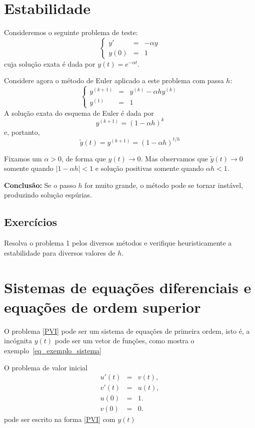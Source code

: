 \section{Estabilidade}

Consideremos o seguinte problema de teste:
$$\left\{\begin{array}{rcl}y'&=&-\alpha y\\y(0)&=&1\end{array}\right.$$
cuja solução exata é dada por $y(t)=e^{-\alpha t}$.

Considere agora o método de Euler aplicado a este problema com passa $h$:
$$\left\{\begin{array}{rcl}y^{(k+1)}&=&y^{(k)}-\alpha h y^{(k)}\\y^{(1)}&=&1\end{array}\right.$$
A solução exata do esquema de Euler é dada por
$$y^{(k+1)}=(1-\alpha h)^{k}$$
e, portanto,
$$\tilde{y}(t)=y^{(k+1)}=(1-\alpha h)^{t/h}$$

Fixamos um $\alpha>0$, de forma que $y(t)\to 0$. Mas observamos que $\tilde{y}(t)\to 0$ somente quando $|1-\alpha h|<1$ e solução positivas somente quando $\alpha h<1$.

{\bf Conclusão:} Se o passo $h$ for muito grande, o método pode se tornar instável, produzindo solução espúrias.




\subsection*{Exercícios}

\begin{exer} Resolva o problema 1 pelos diversos métodos e verifique heuristicamente a estabilidade para diversos valores de $h$.
\end{exer}

\section{Sistemas de equações diferenciais e equações de ordem superior}
O problema \eqref{PVI} pode ser um sistema de equações de primeira ordem, isto é, a incógnita $y(t)$ pode ser um vetor de funções, como mostra o exemplo~\ref{eq_exemplo_sistema}
\begin{ex}\label{exemplo_sistema_PVI}O problema de valor inicial
\begin{subequations}\label{eq_exemplo_sistema}
\begin{eqnarray}
u'(t)&=&v(t),\\
v'(t)&=&u(t),\\
u(0)&=&1.\\
v(0)&=&0.
\end{eqnarray}
\end{subequations}
pode ser escrito na forma \eqref{PVI} com $y(t)$
\end{ex}

